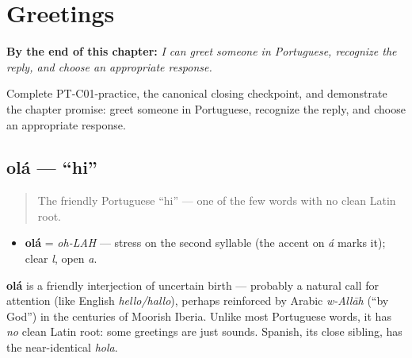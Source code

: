
\chapter{Greetings}
\label{ch:greetings}

\begin{chapteropening}
\textbf{By the end of this chapter:} \emph{I can greet someone in Portuguese, recognize the reply, and choose an appropriate response.}

Complete PT-C01-practice, the canonical closing checkpoint, and demonstrate the chapter promise: greet someone in Portuguese, recognize the reply, and choose an appropriate response.
\end{chapteropening}

\section[olá]{olá — \textquotedblleft{}hi\textquotedblright{}}

\label{lesson:PT-C01-ola}



\begin{quote}
The friendly Portuguese \textquotedblleft{}hi\textquotedblright{} — one of the few words with no clean Latin root.
\end{quote}

\begin{sounds}
\begin{itemize}
\raggedright
  \item \textbf{olá} = \emph{oh-LAH} — stress on the second syllable (the accent on \emph{á} marks it); clear \emph{l}, open \emph{a}.
\end{itemize}
\end{sounds}

\begin{cousinweb}
\textbf{olá} is a friendly interjection of uncertain birth — probably a natural call for attention (like English \emph{hello/hallo}), perhaps reinforced by Arabic \emph{w-Allāh} (\textquotedblleft{}by God\textquotedblright{}) in the centuries of Moorish Iberia. Unlike most Portuguese words, it has \emph{no} clean Latin root: some greetings are just sounds. Spanish, its close sibling, has the near-identical \emph{hola}.
\end{cousinweb}

